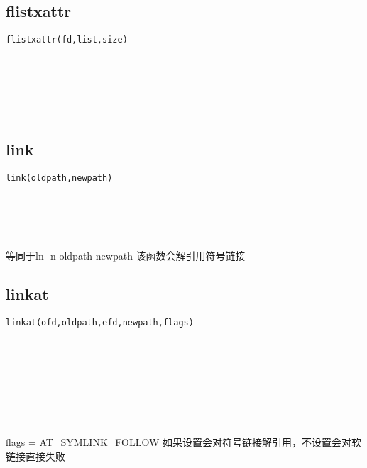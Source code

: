 \documentclass[10pt,a4paper]{article}
\begin{document}
\subsection{flistxattr}
\begin{spacing}{2.0}
\lstset{language=C,numbers=none}
\begin{lstlisting}
flistxattr(fd,list,size)
\end{lstlisting}
{\large\color[rgb]{0.2,0.4,0.6}{fd:}} \\
{\large\color[rgb]{0.2,0.4,0.6}{list:}} \\
{\large\color[rgb]{0.2,0.4,0.6}{size:}}
\paragraph{ \ \ }
\end{spacing}

\section{\color[rgb]{0.2,0.4,0.6}{硬链接与软链接}}
\subsection{link}
\begin{spacing}{2.0}
\lstset{language=C,numbers=none}
\begin{lstlisting}
link(oldpath,newpath)
\end{lstlisting}
{\large\color[rgb]{0.2,0.4,0.6}{oldpath:}} \\
{\large\color[rgb]{0.2,0.4,0.6}{newpath:}}
\paragraph{ \ \ }等同于ln -n oldpath newpath 该函数会解引用符号链接
\end{spacing}

\subsection{linkat}
\begin{spacing}{2.0}
\lstset{language=C,numbers=none}
\begin{lstlisting}
linkat(ofd,oldpath,efd,newpath,flags)
\end{lstlisting}
{\large\color[rgb]{0.2,0.4,0.6}{ofd:}} \\
{\large\color[rgb]{0.2,0.4,0.6}{oldpath:}} \\
{\large\color[rgb]{0.2,0.4,0.6}{efd:}} \\
{\large\color[rgb]{0.2,0.4,0.6}{newpath:}} \\
{\large\color[rgb]{0.2,0.4,0.6}{flags:}}
\paragraph{ \ \ }flags = AT\_SYMLINK\_FOLLOW 如果设置会对符号链接解引用，不设置会对软链接直接失败
\end{spacing}
\end{document}
